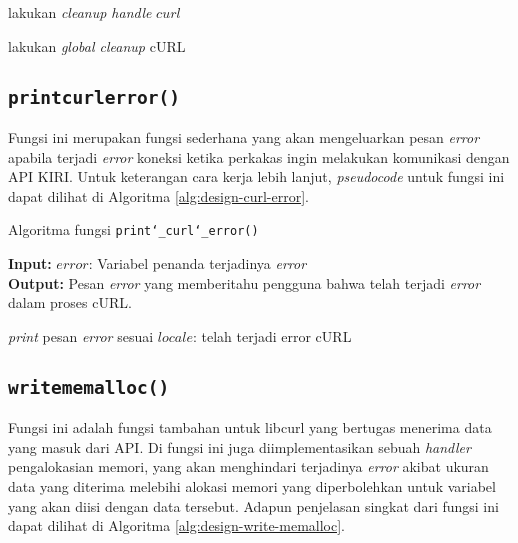 \begin{algorithm}[h]
\begin{algorithmic}
			\State lakukan \textit{cleanup handle} $curl$
		\EndIf
		
		\State lakukan \textit{global cleanup} cURL
		
		\State {}
	\end{algorithmic}
\end{algorithm}

\subsection{\texttt{print\textunderscore curl\textunderscore error()}}
\label{sec:design-code-curl-error}

Fungsi ini merupakan fungsi sederhana yang akan mengeluarkan pesan \textit{error} apabila terjadi \textit{error} koneksi ketika perkakas ingin melakukan komunikasi dengan API KIRI. Untuk keterangan cara kerja lebih lanjut, \textit{pseudocode} untuk fungsi ini dapat dilihat di Algoritma \ref{alg:design-curl-error}.

\begin{algorithm}[h]
	\caption{\textendash\xspace Algoritma fungsi \texttt{print\char`_curl\char`_error()}}
	\label{alg:design-curl-error}
	\vspace{-0.6\baselineskip}
	\begin{flushleft}
		\textbf{Input:} $error$: Variabel penanda terjadinya \textit{error} \\
		\textbf{Output:} Pesan \textit{error} yang memberitahu pengguna bahwa telah terjadi \textit{error} dalam proses cURL. \\
	\end{flushleft}
	\vspace{-1.05\baselineskip}
	\begin{algorithmic}
			\State \textit{print} pesan \textit{error} sesuai $locale$: telah terjadi error cURL
		\EndIf
	\end{algorithmic}
\end{algorithm}

\subsection{\texttt{write\textunderscore memalloc()}}
\label{sec:design-code-write-memalloc}

Fungsi ini adalah fungsi tambahan untuk libcurl yang bertugas menerima data yang masuk dari API. Di fungsi ini juga diimplementasikan sebuah \textit{handler} pengalokasian memori, yang akan menghindari terjadinya \textit{error} akibat ukuran data yang diterima melebihi alokasi memori yang diperbolehkan untuk variabel yang akan diisi dengan data tersebut. Adapun penjelasan singkat dari fungsi ini dapat dilihat di Algoritma \ref{alg:design-write-memalloc}.

